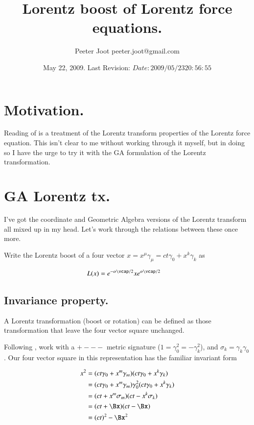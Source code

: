 \documentclass{article}
\title{ Lorentz boost of Lorentz force equations. }
\author{Peeter Joot \quad peeter.joot@gmail.com }
\date{ May 22, 2009.  Last Revision: $Date: 2009/05/23 20:56:55 $ }
\begin{document}
\maketitle{}
\tableofcontents
\section{ Motivation. }

Reading of \cite{bohm1996str} is a treatment of the Lorentz transform
properties of the Lorentz force equation.  This isn't clear to me
without working through it myself, but in doing so I have the urge to
try it with the GA formulation of the Lorentz transformation.

\section{ GA Lorentz tx. }

I've got the coordinate and Geometric Algebra versions of the Lorentz
transform all mixed up in my head.  Let's work through the relations 
between these once more.

Write the Lorentz boost of a four vector $x = x^\mu \gamma_\mu = ct \gamma_0 + x^k \gamma_k$ as

\begin{align}\label{eqn:LorentzBoost}
L(x) &= 
e^{-\alpha \vcap/2}
x
e^{\alpha \vcap/2}
\end{align}

\subsection{ Invariance property. }

A Lorentz transformation (boost or rotation) can be defined as those transformation that leave the four vector square unchanged.

Following \cite{doran2003gap}, work with a $+---$ metric signature ($1 = \gamma_0^2 = -\gamma_k^2$), and $\sigma_k = \gamma_k \gamma_0$.  Our four vector square in this representation has the familiar invariant form

\begin{align*}
x^2 
&= (ct \gamma_0 + x^m \gamma_m) (ct \gamma_0 + x^k \gamma_k) \\
&= (ct \gamma_0 + x^m \gamma_m) \gamma_0^2 (ct \gamma_0 + x^k \gamma_k) \\
&= (ct + x^m \sigma_m) (ct - x^k \sigma_k) \\
&= (ct + \Bx) (ct - \Bx) \\
&= (ct)^2 - \Bx^2
\end{align*}
\end{document}
